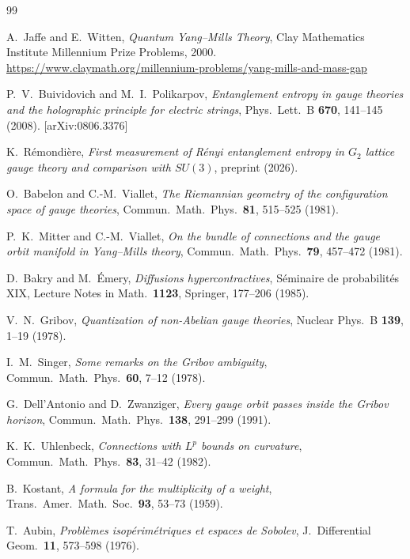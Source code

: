 \documentclass[11pt,a4paper]{amsart}
\theoremstyle{definition}
\theoremstyle{remark}
\begin{document}
\begin{thebibliography}{99}

A.~Jaffe and E.~Witten,
\emph{Quantum Yang--Mills Theory},
Clay Mathematics Institute Millennium Prize Problems, 2000.
\url{https://www.claymath.org/millennium-problems/yang-mills-and-mass-gap}

P.~V.~Buividovich and M.~I.~Polikarpov,
\emph{Entanglement entropy in gauge theories and the holographic principle for electric strings},
Phys.\ Lett.\ B \textbf{670}, 141--145 (2008).
[arXiv:0806.3376]

K.~R\'emondi\`ere,
\emph{First measurement of R\'enyi entanglement entropy in $G_2$ lattice gauge theory and comparison with $SU(3)$},
preprint (2026).

O.~Babelon and C.-M.~Viallet,
\emph{The Riemannian geometry of the configuration space of gauge theories},
Commun.\ Math.\ Phys.\ \textbf{81}, 515--525 (1981).

P.~K.~Mitter and C.-M.~Viallet,
\emph{On the bundle of connections and the gauge orbit manifold in Yang--Mills theory},
Commun.\ Math.\ Phys.\ \textbf{79}, 457--472 (1981).

D.~Bakry and M.~\'Emery,
\emph{Diffusions hypercontractives},
S\'eminaire de probabilit\'es XIX, Lecture Notes in Math.\ \textbf{1123},
Springer, 177--206 (1985).

V.~N.~Gribov,
\emph{Quantization of non-Abelian gauge theories},
Nuclear Phys.\ B \textbf{139}, 1--19 (1978).

I.~M.~Singer,
\emph{Some remarks on the Gribov ambiguity},
Commun.\ Math.\ Phys.\ \textbf{60}, 7--12 (1978).

G.~Dell'Antonio and D.~Zwanziger,
\emph{Every gauge orbit passes inside the Gribov horizon},
Commun.\ Math.\ Phys.\ \textbf{138}, 291--299 (1991).

K.~K.~Uhlenbeck,
\emph{Connections with $L^p$ bounds on curvature},
Commun.\ Math.\ Phys.\ \textbf{83}, 31--42 (1982).

B.~Kostant,
\emph{A formula for the multiplicity of a weight},
Trans.\ Amer.\ Math.\ Soc.\ \textbf{93}, 53--73 (1959).

T.~Aubin,
\emph{Probl\`emes isop\'erim\'etriques et espaces de Sobolev},
J.\ Differential Geom.\ \textbf{11}, 573--598 (1976).


\end{thebibliography}
\end{document}
